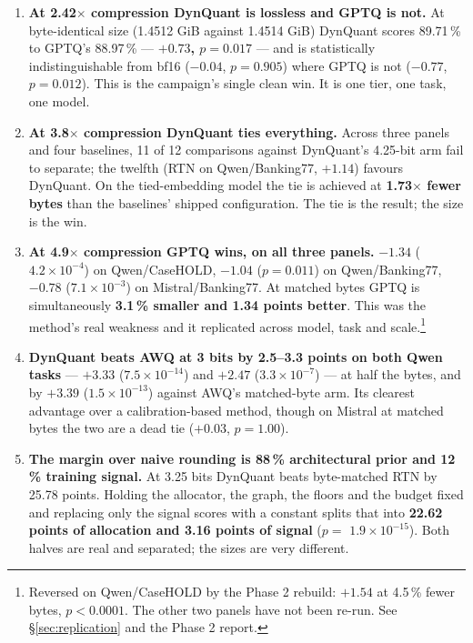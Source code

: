 \documentclass[11pt]{article}
\newcommand{\x}{\texorpdfstring{$\times$}{x}}
\newcommand{\pct}{\,\%}
\newcommand{\e}[2]{$#1\!\times\!10^{#2}$}
\newcommand{\best}[1]{\textbf{#1}}
\begin{document}
\begin{enumerate}[leftmargin=1.4em]
\item \textbf{At 2.42\x{} compression DynQuant is lossless and GPTQ is not.} At byte-identical
size (1.4512 GiB against 1.4514 GiB) DynQuant scores 89.71\pct{} to GPTQ's 88.97\pct{} ---
\best{$+0.73$, $p = 0.017$} --- and is statistically indistinguishable from bf16
($-0.04$, $p = 0.905$) where GPTQ is not ($-0.77$, $p = 0.012$). This is the campaign's single
clean win. It is one tier, one task, one model.

\item \textbf{At 3.8\x{} compression DynQuant ties everything.} Across three panels and four
baselines, 11 of 12 comparisons against DynQuant's 4.25-bit arm fail to separate; the twelfth
(RTN on Qwen/Banking77, $+1.14$) favours DynQuant. On the tied-embedding model the tie is
achieved at \textbf{1.73\x{} fewer bytes} than the baselines' shipped configuration. The tie is
the result; the size is the win.

\item \textbf{At 4.9\x{} compression GPTQ wins, on all three panels.} $-1.34$
(\e{4.2}{-4}) on Qwen/CaseHOLD, $-1.04$ ($p = 0.011$) on Qwen/Banking77, $-0.78$
(\e{7.1}{-3}) on Mistral/Banking77. At matched bytes GPTQ is simultaneously \textbf{3.1\pct{}
smaller and 1.34 points better}. This was the method's real weakness and it replicated across
model, task and scale.\footnote{Reversed on Qwen/CaseHOLD by the Phase 2 rebuild:
$+1.54$ at 4.5\pct{} fewer bytes, $p < 0.0001$. The other two panels have not been re-run.
See \S\ref{sec:replication} and the Phase 2 report.}

\item \textbf{DynQuant beats AWQ at 3 bits by 2.5--3.3 points on both Qwen tasks} ---
$+3.33$ (\e{7.5}{-14}) and $+2.47$ (\e{3.3}{-7}) --- at half the bytes, and by $+3.39$
(\e{1.5}{-13}) against AWQ's matched-byte arm. Its clearest advantage over a calibration-based
method, though on Mistral at matched bytes the two are a dead tie ($+0.03$, $p = 1.00$).

\item \textbf{The margin over naive rounding is 88\pct{} architectural prior and 12\pct{}
training signal.} At 3.25 bits DynQuant beats byte-matched RTN by 25.78 points. Holding the
allocator, the graph, the floors and the budget fixed and replacing only the signal scores with
a constant splits that into \textbf{22.62 points of allocation and 3.16 points of signal}
($p = $ \e{1.9}{-15}). Both halves are real and separated; the sizes are very different.


\end{enumerate}
\end{document}
